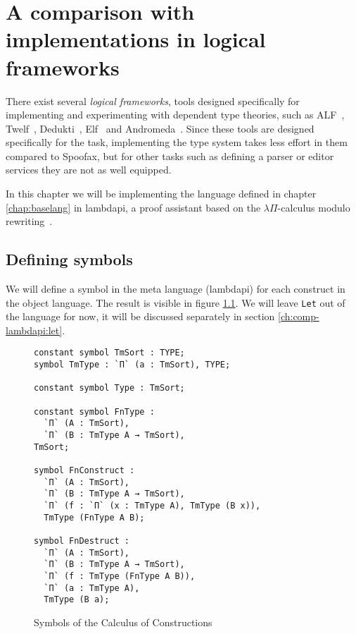 \chapter{A comparison with implementations in logical frameworks}
\label{ch:comp-lambdapi}

There exist several \emph{logical frameworks}, tools designed specifically for implementing and experimenting with dependent type theories, such as ALF~\cite{MagnussonN93}, Twelf~\cite{PfenningS99}, Dedukti~\cite{BoespflugCH12}, Elf~\cite{pfenning_1991} and Andromeda~\cite{BauerHP20}. Since these tools are designed specifically for the task, implementing the type system takes less effort in them compared to Spoofax, but for other tasks such as defining a parser or editor services they are not as well equipped. 

In this chapter we will be implementing the language defined in chapter \ref{chap:baselang} in lambdapi, a proof assistant based on the $\lambda \Pi$-calculus modulo rewriting~\cite{BoespflugCH12}. 

\section{Defining symbols}

We will define a symbol in the meta language (lambdapi) for each construct in the object language. The result is visible in figure \ref{fig:lp-symbols}. We will leave \verb|Let| out of the language for now, it will be discussed separately in section \ref{ch:comp-lambdapi:let}.

\begin{figure}[ht]
\begin{lstlisting}
constant symbol TmSort : TYPE;
symbol TmType : `Π` (a : TmSort), TYPE;

constant symbol Type : TmSort;

constant symbol FnType :
  `Π` (A : TmSort), 
  `Π` (B : TmType A → TmSort), 
TmSort;

symbol FnConstruct :
  `Π` (A : TmSort), 
  `Π` (B : TmType A → TmSort), 
  `Π` (f : `Π` (x : TmType A), TmType (B x)), 
  TmType (FnType A B);

symbol FnDestruct :
  `Π` (A : TmSort), 
  `Π` (B : TmType A → TmSort), 
  `Π` (f : TmType (FnType A B)),
  `Π` (a : TmType A),
  TmType (B a);
\end{lstlisting}
	\caption{Symbols of the Calculus of Constructions}
\label{fig:lp-symbols}
\end{figure}

